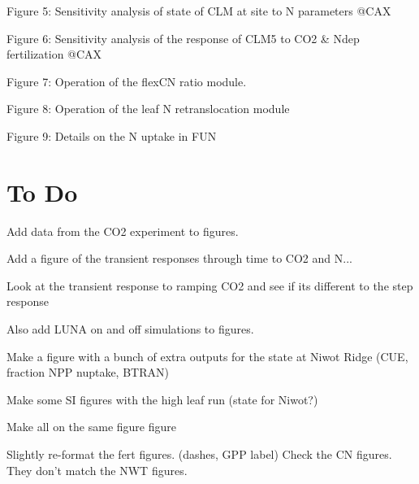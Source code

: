 \documentclass[draft,linenumbers]{agujournal}
\begin{document}
Figure 5: Sensitivity analysis of state of CLM at site to N parameters @CAX

Figure 6: Sensitivity analysis of the response of CLM5 to CO2 \& Ndep fertilization @CAX

Figure 7: Operation of the flexCN ratio module.

Figure 8: Operation of the leaf N retranslocation module

Figure 9: Details on the N uptake in FUN


\section{To Do}
Add data from the CO2 experiment to figures.

Add a figure of the transient responses through time to CO2 and N... 

Look at the transient response to ramping CO2 and see if its different to the step response

Also add LUNA on and off simulations to figures.

Make a figure with a bunch of extra outputs for the state at Niwot Ridge (CUE, fraction NPP nuptake, BTRAN)
\nocite{*}

Make some SI figures with the high leaf run (state for Niwot?)

Make all on the same figure figure

Slightly re-format the fert figures. (dashes, GPP label)
Check the CN figures. They don't match the NWT figures. 



\end{document}
